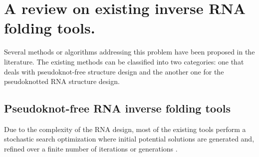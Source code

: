 \section{A review on existing inverse RNA folding tools.}

Several methods or algorithms addressing this problem have been proposed in the literature. The existing methods can be classified into two categories: one that deals with pseudoknot-free structure design and the another one for the pseudoknotted RNA structure design.  

\subsection{Pseudoknot-free RNA inverse folding tools}
Due to the complexity of the RNA design,  most of the existing tools perform a stochastic search optimization where initial potential solutions are generated and, refined over a finite number of iterations or generations \cite{esmaili2015erd, dromi2008reconstruction,esmaili2014evolutionary,taneda2011modena,nemo2018}.


